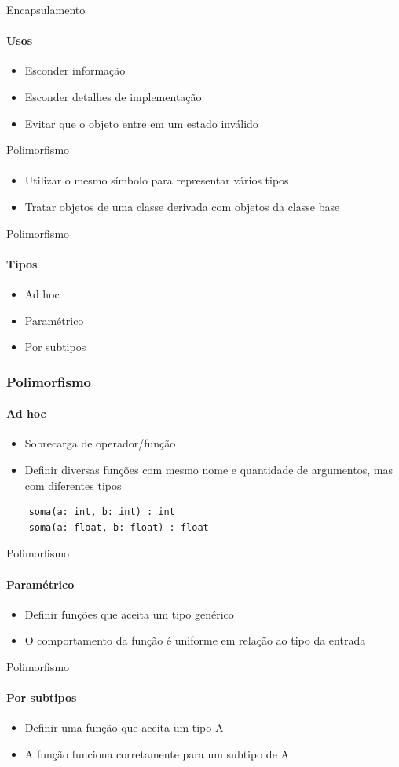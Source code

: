 \begin{frame}{Encapsulamento}
\framesubtitle{Usos}
\begin{itemize}
    \item Esconder informação
    \item Esconder detalhes de implementação
    \item Evitar que o objeto entre em um estado inválido
\end{itemize}
\end{frame}

\begin{frame}{Polimorfismo}
\framesubtitle{}
\begin{itemize}
    \item Utilizar o mesmo símbolo para representar vários tipos
    \item Tratar objetos de uma classe derivada com objetos da classe base
\end{itemize}
\end{frame}

\begin{frame}{Polimorfismo}
\framesubtitle{Tipos}
\begin{itemize}
    \item Ad hoc
    \item Paramétrico
    \item Por subtipos
\end{itemize}
\end{frame}

\begin{frame}[fragile]
\frametitle{Polimorfismo}
\framesubtitle{Ad hoc}
\begin{itemize}
    \item Sobrecarga de operador/função
    \item Definir diversas funções com mesmo nome e quantidade de argumentos, mas com diferentes tipos
\end{itemize}
\begin{verbatim}
    soma(a: int, b: int) : int
    soma(a: float, b: float) : float
\end{verbatim}
\end{frame}

\begin{frame}{Polimorfismo}
\framesubtitle{Paramétrico}
\begin{itemize}
    \item Definir funções que aceita um tipo genérico
    \item O comportamento da função é uniforme em relação ao tipo da entrada
\end{itemize}
\end{frame}

\begin{frame}{Polimorfismo}
\framesubtitle{Por subtipos}
\begin{itemize}
    \item Definir uma função que aceita um tipo A
    \item A função funciona corretamente para um subtipo de A
\end{itemize}
\end{frame}